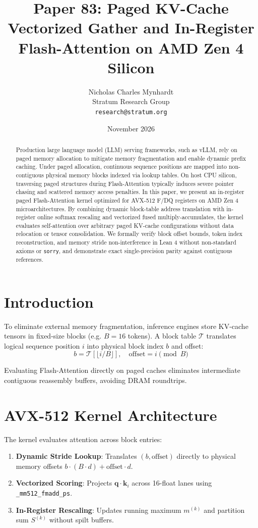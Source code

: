 \documentclass[10pt,twocolumn,letterpaper]{article}
\title{Paper 83: Paged KV-Cache Vectorized Gather and In-Register Flash-Attention on AMD Zen 4 Silicon}
\author{Nicholas Charles Mynhardt \\ Stratum Research Group \\ \texttt{research@stratum.org}}
\date{November 2026}
\begin{document}
\maketitle

\begin{abstract}
Production large language model (LLM) serving frameworks, such as vLLM, rely on paged memory allocation to mitigate memory fragmentation and enable dynamic prefix caching. Under paged allocation, continuous sequence positions are mapped into non-contiguous physical memory blocks indexed via lookup tables. On host CPU silicon, traversing paged structures during Flash-Attention typically induces severe pointer chasing and scattered memory access penalties. In this paper, we present an in-register paged Flash-Attention kernel optimized for AVX-512 F/DQ registers on AMD Zen 4 microarchitectures. By combining dynamic block-table address translation with in-register online softmax rescaling and vectorized fused multiply-accumulates, the kernel evaluates self-attention over arbitrary paged KV-cache configurations without data relocation or tensor consolidation. We formally verify block offset bounds, token index reconstruction, and memory stride non-interference in Lean 4 without non-standard axioms or \texttt{sorry}, and demonstrate exact single-precision parity against contiguous references.
\end{abstract}

\section{Introduction}
To eliminate external memory fragmentation, inference engines store KV-cache tensors in fixed-size blocks (e.g. $B=16$ tokens). A block table $\mathcal{T}$ translates logical sequence position $i$ into physical block index $b$ and offset:
\begin{equation}
b = \mathcal{T}[\lfloor i / B \rfloor], \quad \text{offset} = i \pmod{B}
\end{equation}

Evaluating Flash-Attention directly on paged caches eliminates intermediate contiguous reassembly buffers, avoiding DRAM roundtrips.

\section{AVX-512 Kernel Architecture}
The kernel evaluates attention across block entries:
\begin{enumerate}
    \item \textbf{Dynamic Stride Lookup}: Translates $(b, \text{offset})$ directly to physical memory offsets $b \cdot (B \cdot d) + \text{offset} \cdot d$.
    \item \textbf{Vectorized Scoring}: Projects $\mathbf{q} \cdot \mathbf{k}_i$ across 16-float lanes using \texttt{\_mm512\_fmadd\_ps}.
    \item \textbf{In-Register Rescaling}: Updates running maximum $m^{(k)}$ and partition sum $S^{(k)}$ without spilt buffers.
\end{enumerate}
\end{document}
